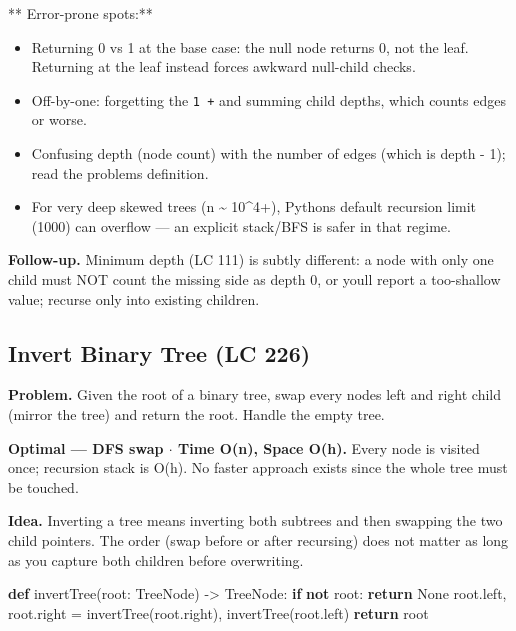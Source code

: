 \documentclass[11pt]{article}
\providecommand{\tightlist}{\setlength{\itemsep}{1pt}\setlength{\parskip}{0pt}}
\newenvironment{Shaded}{\begin{snugshade}}{\end{snugshade}}
\newcommand{\ControlFlowTok}[1]{\textcolor[rgb]{0.99,0.74,0.29}{\textbf{#1}}}
\newcommand{\KeywordTok}[1]{\textcolor[rgb]{0.81,0.81,0.76}{\textbf{#1}}}
\newcommand{\NormalTok}[1]{\textcolor[rgb]{0.81,0.81,0.76}{#1}}
\newcommand{\OperatorTok}[1]{\textcolor[rgb]{0.81,0.81,0.76}{#1}}
\newcommand{\VariableTok}[1]{\textcolor[rgb]{0.15,0.68,0.68}{#1}}
\begin{document}
** Error-prone spots:**

\begin{itemize}
\tightlist
\item
  Returning 0 vs 1 at the base case: the null node returns 0, not the leaf. Returning at the leaf instead forces awkward null-child checks.
\item
  Off-by-one: forgetting the \texttt{1\ +} and summing child depths, which counts edges or worse.
\item
  Confusing depth (node count) with the number of edges (which is depth - 1); read the problem\textquotesingle s definition.
\item
  For very deep skewed trees (n \textasciitilde{} 10\^{}4+), Python\textquotesingle s default recursion limit (1000) can overflow --- an explicit stack/BFS is safer in that regime.
\end{itemize}

\textbf{Follow-up.} Minimum depth (LC 111) is subtly different: a node with only one child must NOT count the missing side as depth 0, or you\textquotesingle ll report a too-shallow value; recurse only into existing children.

\subsection{Invert Binary Tree (LC 226)}\label{invert-binary-tree-lc-226}

\textbf{Problem.} Given the root of a binary tree, swap every node\textquotesingle s left and right child (mirror the tree) and return the root. Handle the empty tree.

\textbf{Optimal --- DFS swap \(\cdot\) Time O(n), Space O(h).} Every node is visited once; recursion stack is O(h). No faster approach exists since the whole tree must be touched.

\textbf{Idea.} Inverting a tree means inverting both subtrees and then swapping the two child pointers. The order (swap before or after recursing) does not matter as long as you capture both children before overwriting.


\begin{Shaded}
\begin{Highlighting}[]
\KeywordTok{def}\NormalTok{ invertTree(root: TreeNode) }\OperatorTok{{-}\textgreater{}}\NormalTok{ TreeNode:}
    \ControlFlowTok{if} \KeywordTok{not}\NormalTok{ root:}
        \ControlFlowTok{return} \VariableTok{None}
\NormalTok{    root.left, root.right }\OperatorTok{=}\NormalTok{ invertTree(root.right), invertTree(root.left)}
    \ControlFlowTok{return}\NormalTok{ root}
\end{Highlighting}
\end{Shaded}
\end{document}
